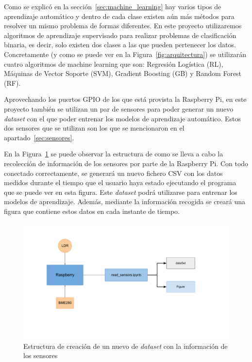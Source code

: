 \documentclass[a4paper, 12pt]{book}
\begin{document}
Como se explicó en la sección~\ref{sec:machine_learning} hay varios tipos de aprendizaje automático y dentro de cada clase existen aún más métodos para resolver un mismo problema de formas diferentes. En este proyecto utilizaremos algoritmos de aprendizaje supervisado para realizar problemas de clasificación binaria, es decir, solo existen dos clases a las que pueden pertenecer los datos. Concretamente (y como se puede ver en la Figura~\ref{fig:arquitectura}) se utilizarán cuatro algoritmos de machine learning que son: Regresión Logística (RL), Máquinas de Vector Soporte (SVM), Gradient Boosting (GB) y Random Forest (RF).

Aprovechando los puertos GPIO de los que está provista la Raspberry Pi, en este proyecto también se utilizan un par de sensores para poder generar un nuevo \textit{dataset} con el que poder entrenar los modelos de aprendizaje automático. Estos dos sensores que se utilizan son los que se mencionaron en el apartado~\ref{sec:sensores}.

En la Figura~\ref{fig:esquema_sensores} se puede observar la estructura de como se lleva a cabo la recolección de información de los sensores por parte de la Raspberry Pi. Con todo conectado correctamente, se generará un nuevo fichero CSV con los datos medidos durante el tiempo que el usuario haya estado ejecutando el programa que se puede ver en esta figura. Este \textit{dataset} podrá utilizarse para entrenar los modelos de aprendizaje. Además, mediante la información recogida se creará una figura que contiene estos datos en cada instante de tiempo.

\begin{figure}[htb]
  \centering
  \includegraphics[width=15cm, keepaspectratio]{img/esquema_sensores.pdf}
  \caption{Estructura de creación de un nuevo de \textit{dataset} con la información de los sensores}\label{fig:esquema_sensores}
\end{figure}
\end{document}
